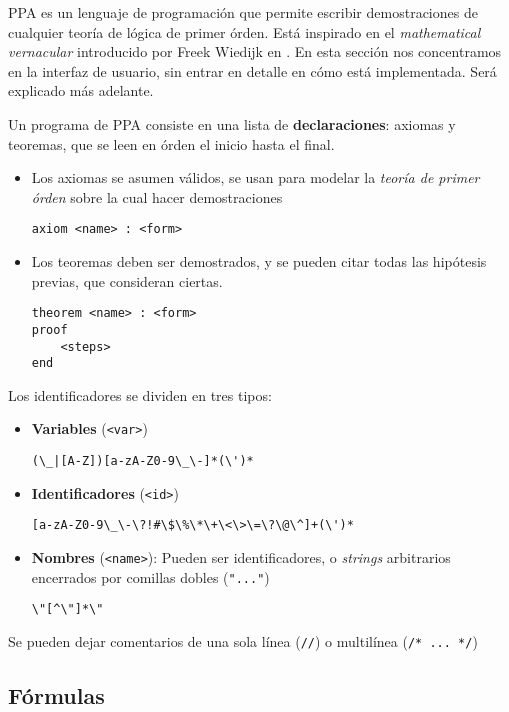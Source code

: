 PPA es un lenguaje de programación que permite escribir demostraciones de
cualquier teoría de lógica de primer órden. Está inspirado en el
\textit{mathematical vernacular} introducido por Freek Wiedijk en
\cite{freek-mv}. En esta sección nos concentramos en la interfaz de usuario, sin
entrar en detalle en cómo está implementada. Será explicado más adelante.

Un programa de PPA consiste en una lista de \textbf{declaraciones}: axiomas y
teoremas, que se leen en órden el inicio hasta el final.

\begin{itemize}
    \item Los axiomas se asumen válidos, se usan para modelar la \textit{teoría
    de primer órden} sobre la cual hacer demostraciones

    \begin{lstlisting}
axiom <name> : <form>
    \end{lstlisting}

    \item Los teoremas deben ser demostrados, y se pueden citar todas las
    hipótesis previas, que consideran ciertas.

    \begin{lstlisting}
theorem <name> : <form>
proof
    <steps>
end
    \end{lstlisting}
\end{itemize}

Los identificadores se dividen en tres tipos:

\begin{itemize}
    \item \textbf{Variables} (\texttt{<var>})
    
    \verb/(\_|[A-Z])[a-zA-Z0-9\_\-]*(\')*/

    \item \textbf{Identificadores} (\texttt{<id>})

    \verb/[a-zA-Z0-9\_\-\?!#\$\%\*\+\<\>\=\?\@\^]+(\')*/

    \item \textbf{Nombres} (\texttt{<name>}): Pueden ser identificadores, o
    \textit{strings} arbitrarios encerrados por comillas dobles (\texttt{"..."})

    \verb/\"[^\"]*\"/
\end{itemize}

Se pueden dejar comentarios de una sola línea (\texttt{//}) o multilínea
(\texttt{/* ... */})

\subsection{Fórmulas}

